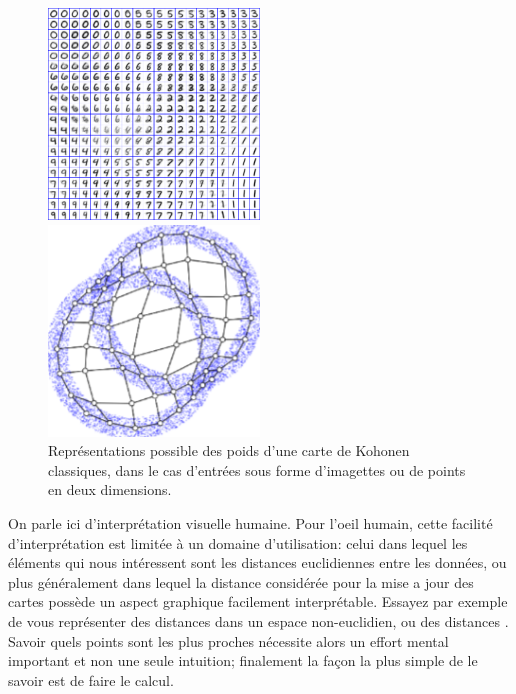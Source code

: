 \begin{figure}
\begin{minipage}{0.5\textwidth}
\centering
\includegraphics[width=0.5\textwidth]{digits.jpg}
\end{minipage}
\begin{minipage}{0.5\textwidth}
\centering
\includegraphics[width=0.5\textwidth]{points.png}
\end{minipage}
\label{fig:representation}
\caption{Représentations possible des poids d'une carte de Kohonen classiques, dans le cas d'entrées sous forme d'imagettes ou de points en deux dimensions.}
\end{figure}

On parle ici d'interprétation visuelle humaine. Pour l'oeil humain, cette facilité d'interprétation est limitée à un domaine d'utilisation: celui dans lequel les éléments qui nous intéressent sont les distances euclidiennes entre les données, ou plus généralement dans lequel la distance considérée pour la mise a jour des cartes possède un aspect graphique facilement interprétable. Essayez par exemple de vous représenter des distances dans un espace non-euclidien, ou des distances . Savoir quels points sont les plus proches nécessite alors un effort mental important et non une seule intuition; finalement la façon la plus simple de le savoir est de faire le calcul.
 
